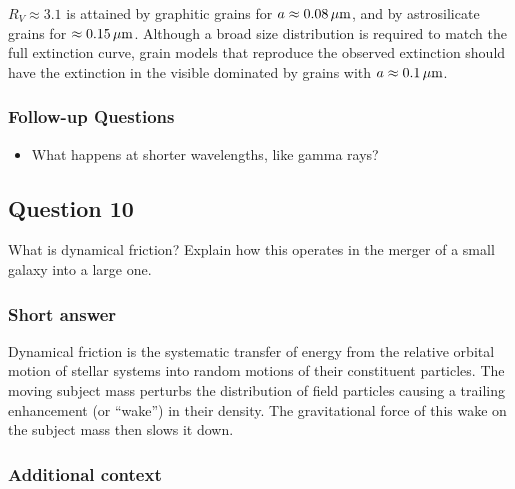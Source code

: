 \documentclass[a4paper,10pt]{article}
\begin{document}
{\noindent}$R_V\approx3.1$ is attained by graphitic grains for $a\approx0.08\,\mu{\rm m}$, and by astrosilicate grains for $\approx0.15\,\mu{\rm m}$. Although a broad size distribution is required to match the full extinction curve, grain models that reproduce the observed extinction should have the extinction in the visible dominated by grains with $a\approx0.1\,\mu{\rm m}$.


\subsubsection{Follow-up Questions}

\begin{itemize}
    \item What happens at shorter wavelengths, like gamma rays?
\end{itemize}


\newpage
\subsection{Question 10}

What is dynamical friction? Explain how this operates in the merger of a small galaxy into a large one.

\subsubsection{Short answer}

Dynamical friction is the systematic transfer of energy from the relative orbital motion of stellar systems into random motions of their constituent particles. The moving subject mass perturbs the
distribution of field particles causing a trailing enhancement (or ``wake'') in their density. The gravitational force of this
wake on the subject mass then slows it down.

\subsubsection{Additional context}
\end{document}
